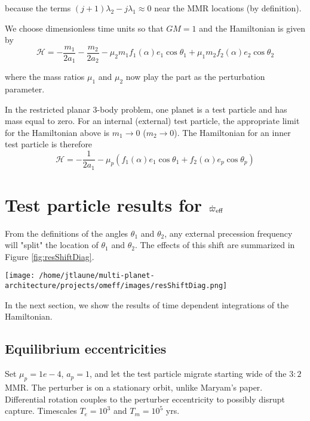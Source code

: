 \documentclass[11pt]{article}
\begin{document}
\noindent
because the terms \((j+1)\lambda_2-j\lambda_1\approx 0\) near the MMR locations (by definition).

We choose dimensionless time units so that \(GM=1\) and
the Hamiltonian is given by
\begin{equation}
  \mathcal{H} = -\frac{m_1}{2a_1} -\frac{m_2}{2a_2} - \mu_2 m_1 f_1(\alpha) e_1 \cos\theta_1 + \mu_1 m_2 f_2(\alpha) e_2\cos\theta_2
\end{equation}

\noindent
where the mass ratios \(\mu_1\) and \(\mu_2\) now play the part as the perturbation parameter.

In the restricted planar 3-body problem, one planet is a test particle and has mass equal to zero.
For an internal (external) test particle,
the appropriate limit for the Hamiltonian above is \(m_1\to0\) (\(m_2\to0\)).
The Hamiltonian for an inner test particle is therefore
\begin{equation}
  \mathcal{H} = -\frac{1}{2a_1} - \mu_p( f_1(\alpha) e_1 \cos\theta_1 + f_2(\alpha) e_p\cos\theta_p)
\end{equation}

\noindent

\section{Test particle results for \(\dot\varpi_{\rm eff}\)}
\label{sec:org4ed446b}
From the definitions of the angles \(\theta_1\) and \(\theta_2\),
any external precession frequency will "split" the location
of \(\theta_1\) and \(\theta_2\). The effects of this
shift are summarized in Figure \ref{fig:resShiftDiag}.


\begin{center}
\texttt{[image: /home/jtlaune/multi-planet-architecture/projects/omeff/images/resShiftDiag.png]}
\end{center}

In the next section, we show the results of time dependent integrations
of the Hamiltonian.

\subsection{Equilibrium eccentricities}
\label{sec:org02d6f87}
Set \(\mu_p=1e-4\), \(a_p=1\), and let the test particle migrate starting
wide of the \(3:2\) MMR. The perturber is on a stationary orbit, unlike
Maryam's paper. Differential rotation couples to the perturber
eccentricity to possibly disrupt capture. Timescales \(T_e = 10^3\) and
\(T_m = 10^5\) yrs.
\end{document}
